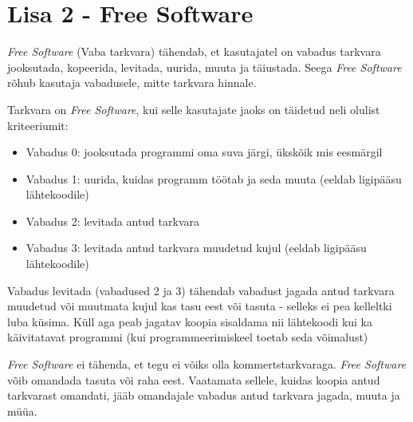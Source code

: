 \documentclass[a4paper,12pt]{article} %
\begin{document}
\section*{Lisa 2 - Free Software}
\label{lisa2}
\textit{Free Software} (Vaba tarkvara) tähendab, et kasutajatel on vabadus tarkvara jooksutada, kopeerida, levitada, uurida, muuta ja täiustada. Seega \textit{Free Software} rõhub kasutaja vabadusele, mitte tarkvara hinnale. \par
Tarkvara on \textit{Free Software}, kui selle kasutajate jaoks on täidetud neli olulist kriteeriumit:
\begin{itemize}
\item Vabadus 0: jooksutada programmi oma suva järgi, ükskõik mis eesmärgil
\item Vabadus 1: uurida, kuidas programm töötab ja seda muuta (eeldab ligipääsu lähtekoodile)
\item Vabadus 2: levitada antud tarkvara
\item Vabadus 3: levitada antud tarkvara muudetud kujul (eeldab ligipääsu lähtekoodile)
\end{itemize}
Vabadus levitada (vabadused 2 ja 3) tähendab vabadust jagada antud tarkvara muudetud või muutmata kujul kas tasu eest või tasuta - selleks ei pea kelleltki luba küsima. Küll aga peab jagatav koopia sisaldama nii lähtekoodi kui ka käivitatavat programmi (kui programmeerimiskeel toetab seda võimalust)\par
\textit{Free Software} ei tähenda, et tegu ei võiks olla kommertstarkvaraga. \textit{Free Software} võib omandada tasuta või raha eest. Vaatamata sellele, kuidas koopia antud tarkvarast omandati,  jääb omandajale vabadus antud tarkvara jagada, muuta ja müüa.
\cite{GNU_Free_SW}
\end{document}
